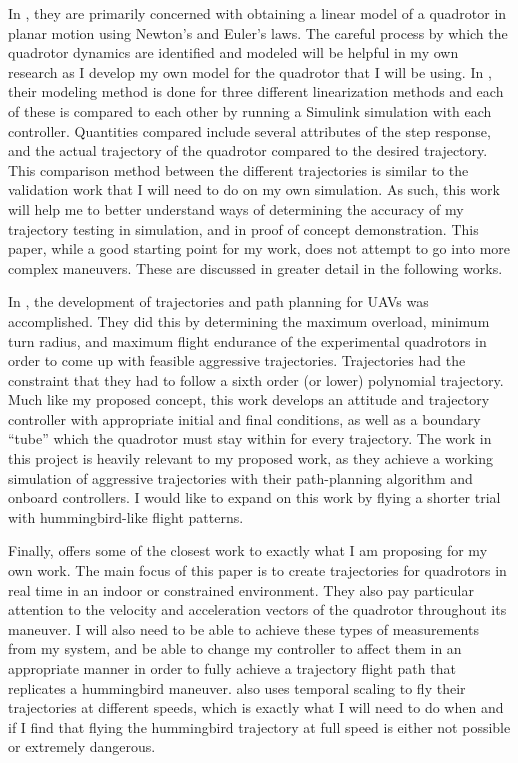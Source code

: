 \documentclass[onecolumn,10pt]{IEEEtran}
\begin{document}
In \cite{sabatino2015quadrotor}, they are primarily concerned with obtaining a linear model of a quadrotor in planar motion using Newton’s and Euler’s laws. The careful process by which the quadrotor dynamics are identified and modeled will be helpful in my own research as I develop my own model for the quadrotor that I will be using. In \cite{sabatino2015quadrotor}, their modeling method is done for three different linearization methods and each of these is compared to each other by running a Simulink simulation with each controller. Quantities compared include several attributes of the step response, and the actual trajectory of the quadrotor compared to the desired trajectory. This comparison method between the different trajectories is similar to the validation work that I will need to do on my own simulation. As such, this work will help me to better understand ways of determining the accuracy of my trajectory testing in simulation, and in proof of concept demonstration. This paper, while a good starting point for my work, does not attempt to go into more complex maneuvers. These are discussed in greater detail in the following works.

In \cite{liu2017planning}, the development of trajectories and path planning for UAVs was accomplished. They did this by determining the maximum overload, minimum turn radius, and maximum flight endurance of the experimental quadrotors in order to come up with feasible aggressive trajectories. Trajectories had the constraint that they had to follow a sixth order (or lower) polynomial trajectory. Much like my proposed concept, this work develops an attitude and trajectory controller with appropriate initial and final conditions, as well as a boundary “tube” which the quadrotor must stay within for every trajectory. The work in this project is heavily relevant to my proposed work, as they achieve a working simulation of aggressive trajectories with their path-planning algorithm and onboard controllers. I would like to expand on this work by flying a shorter trial with hummingbird-like flight patterns. 

Finally, \cite{mellinger2011minimum} offers some of the closest work to exactly what I am proposing for my own work. The main focus of this paper is to create trajectories for quadrotors in real time in an indoor or constrained environment. They also pay particular attention to the velocity and acceleration vectors of the quadrotor throughout its maneuver. I will also need to be able to achieve these types of measurements from my system, and be able to change my controller to affect them in an appropriate manner in order to fully achieve a trajectory flight path that replicates a hummingbird maneuver. \cite{mellinger2011minimum} also uses temporal scaling to fly their trajectories at different speeds, which is exactly what I will need to do when and if I find that flying the hummingbird trajectory at full speed is either not possible or extremely dangerous. 
\end{document}
